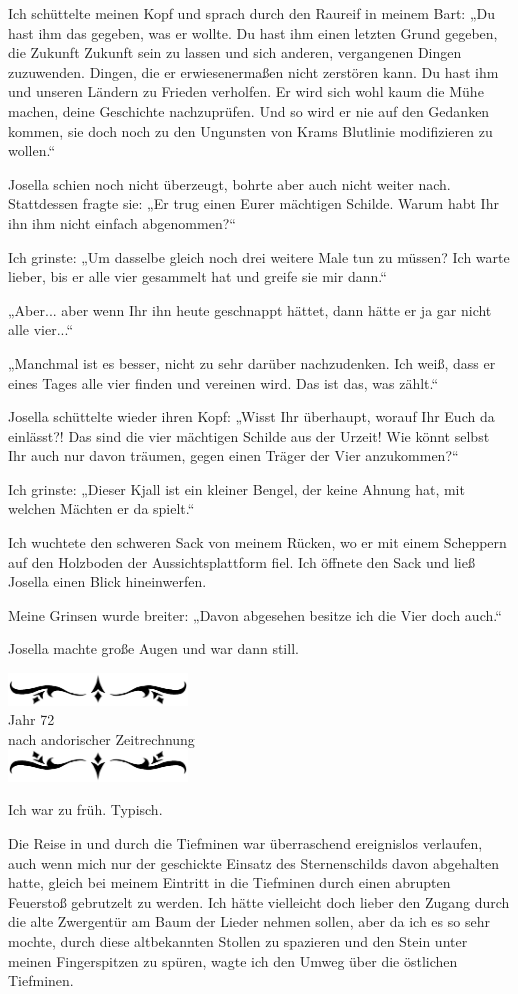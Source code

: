 \documentclass[10pt, a4paper, oneside]{book}
\newcommand{\az}[1]{%
    \begin{center}
        \includegraphics[width=180px]{Das Erbe des Wunderkindes/verzierung1.png}\\
        {\Huge #1} \\
        {nach andorischer Zeitrechnung}\\
        \includegraphics[width=180px]{Das Erbe des Wunderkindes/verzierung2.png}
    \end{center}
    \extramarks{}{#1 a.Z.}
}
\begin{document}
Ich schüttelte meinen Kopf und sprach durch den Raureif in meinem Bart: „Du hast ihm das gegeben, was er wollte. Du hast ihm einen letzten Grund gegeben, die Zukunft Zukunft sein zu lassen und sich anderen, vergangenen Dingen zuzuwenden. Dingen, die er erwiesenermaßen nicht zerstören kann. Du hast ihm und unseren Ländern zu Frieden verholfen. Er wird sich wohl kaum die Mühe machen, deine Geschichte nachzuprüfen. Und so wird er nie auf den Gedanken kommen, sie doch noch zu den Ungunsten von Krams Blutlinie modifizieren zu wollen.“

Josella schien noch nicht überzeugt, bohrte aber auch nicht weiter nach. Stattdessen fragte sie: „Er trug einen Eurer mächtigen Schilde. Warum habt Ihr ihn ihm nicht einfach abgenommen?“

Ich grinste: „Um dasselbe gleich noch drei weitere Male tun zu müssen? Ich warte lieber, bis er alle vier gesammelt hat und greife sie mir dann.“

„Aber... aber wenn Ihr ihn heute geschnappt hättet, dann hätte er ja gar nicht alle vier...“

„Manchmal ist es besser, nicht zu sehr darüber nachzudenken. Ich weiß, dass er eines Tages alle vier finden und vereinen wird. Das ist das, was zählt.“

Josella schüttelte wieder ihren Kopf: „Wisst Ihr überhaupt, worauf Ihr Euch da einlässt?! Das sind die vier mächtigen Schilde aus der Urzeit! Wie könnt selbst Ihr auch nur davon träumen, gegen einen Träger der Vier anzukommen?“

Ich grinste: „Dieser Kjall ist ein kleiner Bengel, der keine Ahnung hat, mit welchen Mächten er da spielt.“

Ich wuchtete den schweren Sack von meinem Rücken, wo er mit einem Scheppern auf den Holzboden der Aussichtsplattform fiel. Ich öffnete den Sack und ließ Josella einen Blick hineinwerfen.

Meine Grinsen wurde breiter: „Davon abgesehen besitze ich die Vier doch auch.“

Josella machte große Augen und war dann still.\bigskip




\az{Jahr 72}

Ich war zu früh. Typisch.

Die Reise in und durch die Tiefminen war überraschend ereignislos verlaufen, auch wenn mich nur der geschickte Einsatz des Sternenschilds davon abgehalten hatte, gleich bei meinem Eintritt in die Tiefminen durch einen abrupten Feuerstoß gebrutzelt zu werden. Ich hätte vielleicht doch lieber den Zugang durch die alte Zwergentür am Baum der Lieder nehmen sollen, aber da ich es so sehr mochte, durch diese altbekannten Stollen zu spazieren und den Stein unter meinen Fingerspitzen zu spüren, wagte ich den Umweg über die östlichen Tiefminen.
\end{document}
